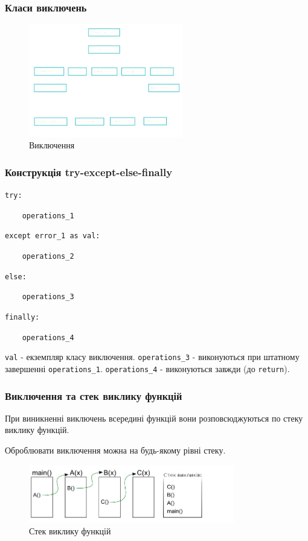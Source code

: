 \begin{frame}
\frametitle{Класи виключень}
\begin{figure}
\begin{center}
 \includegraphics[width=0.6\textwidth]{pictures/exception.png}
\caption{Виключення}
\label{exception} 
\end{center}
\end{figure}

\end{frame}

\begin{frame}
\frametitle{Конструкція try-except-else-finally}
\texttt{try:}

\texttt{~~~~operations\_1}

\texttt{except error\_1 as val:}

\texttt{~~~~operations\_2}

\texttt{else:}

\texttt{~~~~operations\_3}

\texttt{finally:}

\texttt{~~~~operations\_4}

\texttt{val} - екземпляр класу виключення. \texttt{operations\_3} - виконуються при штатному завершенні \texttt{operations\_1}. \texttt{operations\_4} - виконуються завжди (до \texttt{return}).
\end{frame}

\begin{frame}
\frametitle{Виключення та стек виклику функцій}
При виникненні виключень всередині функцій вони розповсюджуються по стеку виклику функцій.

Оброблювати виключення можна на будь-якому рівні стеку.

\begin{figure}
  \begin{center}
    \includegraphics[width=0.8\textwidth,height=0.4\textheight]{pictures/stack.png}
  \caption{Стек виклику функцій}
\label{function}
  \end{center}
\end{figure}
\end{frame}

